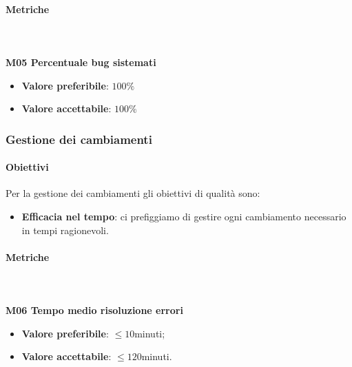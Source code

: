 		\paragraph{Metriche} \mbox{} \\ \\
		\textbf{M05 Percentuale bug sistemati}
		\begin{itemize}
			\item \textbf{Valore preferibile}: $100\%$
			\item \textbf{Valore accettabile}: $100\%$  
		\end{itemize}
			
		\subsubsection{Gestione dei cambiamenti}
		\paragraph{Obiettivi}
		Per la gestione dei cambiamenti gli obiettivi di qualità sono:
		\begin{itemize}
			\item \textbf{Efficacia nel tempo}: ci prefiggiamo di gestire ogni cambiamento necessario in tempi ragionevoli.
		\end{itemize}
		 	\paragraph{Metriche} \mbox{} \\ \\
		 	\textbf{M06 Tempo medio risoluzione errori}
			\begin{itemize}
				\item \textbf{Valore preferibile}: $\le 10$minuti;
				\item \textbf{Valore accettabile}: $\le 120$minuti.
			\end{itemize}
      
